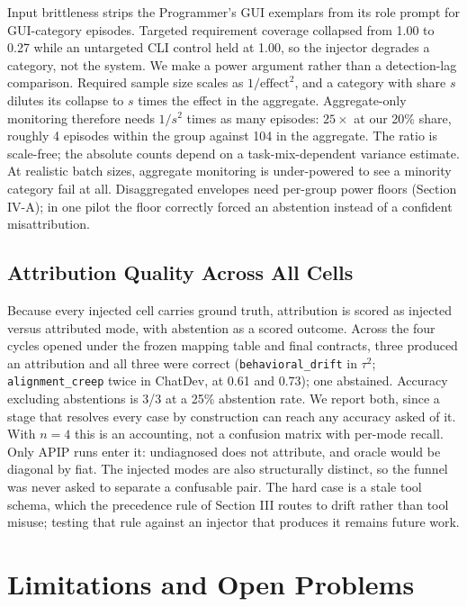 \documentclass[conference]{IEEEtran}
\begin{document}
Input brittleness strips the Programmer's GUI exemplars from its role prompt for GUI-category episodes. Targeted requirement coverage collapsed from 1.00 to 0.27 while an untargeted CLI control held at 1.00, so the injector degrades a category, not the system. We make a power argument rather than a detection-lag comparison. Required sample size scales as $1/\text{effect}^2$, and a category with share $s$ dilutes its collapse to $s$ times the effect in the aggregate. Aggregate-only monitoring therefore needs $1/s^2$ times as many episodes: $25\times$ at our 20\% share, roughly 4 episodes within the group against 104 in the aggregate. The ratio is scale-free; the absolute counts depend on a task-mix-dependent variance estimate. At realistic batch sizes, aggregate monitoring is under-powered to see a minority category fail at all. Disaggregated envelopes need per-group power floors (Section IV-A); in one pilot the floor correctly forced an abstention instead of a confident misattribution.

\subsection{Attribution Quality Across All Cells}

Because every injected cell carries ground truth, attribution is scored as injected versus attributed mode, with abstention as a scored outcome. Across the four cycles opened under the frozen mapping table and final contracts, three produced an attribution and all three were correct (\texttt{behavioral\_drift} in $\tau^2$; \texttt{alignment\_creep} twice in ChatDev, at 0.61 and 0.73); one abstained. Accuracy excluding abstentions is 3/3 at a 25\% abstention rate. We report both, since a stage that resolves every case by construction can reach any accuracy asked of it. With $n = 4$ this is an accounting, not a confusion matrix with per-mode recall. Only APIP runs enter it: undiagnosed does not attribute, and oracle would be diagonal by fiat. The injected modes are also structurally distinct, so the funnel was never asked to separate a confusable pair. The hard case is a stale tool schema, which the precedence rule of Section III routes to drift rather than tool misuse; testing that rule against an injector that produces it remains future work.

\section{Limitations and Open Problems}
\end{document}
